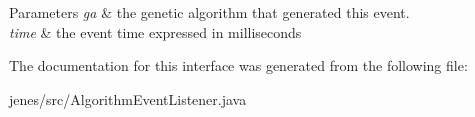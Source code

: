 \begin{DoxyParams}{Parameters}
{\em ga} & the genetic algorithm that generated this event. \\
\hline
{\em time} & the event time expressed in milliseconds \\
\hline
\end{DoxyParams}


The documentation for this interface was generated from the following file\-:\begin{DoxyCompactItemize}
\item 
jenes/src/Algorithm\-Event\-Listener.\-java\end{DoxyCompactItemize}
